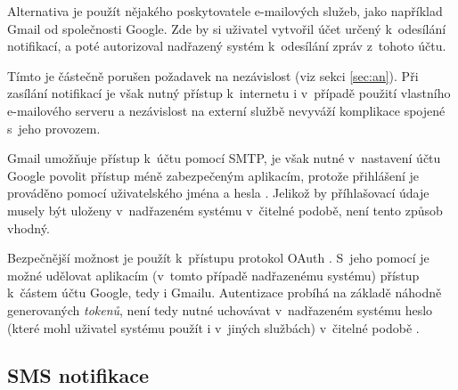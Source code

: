 Alternativa je použít nějakého poskytovatele e-mailových služeb, jako například Gmail od společnosti Google. Zde by si uživatel vytvořil účet určený k~odesílání notifikací, a poté autorizoval nadřazený systém k~odesílání zpráv z~tohoto účtu. 

Tímto je částečně porušen požadavek na nezávislost (viz sekci \ref{sec:an}). Při zasílání notifikací je však nutný přístup k~internetu i v~případě použití vlastního e-mailového serveru a nezávislost na externí službě nevyváží komplikace spojené s~jeho provozem.

Gmail umožňuje přístup k~účtu pomocí SMTP, je však nutné v~nastavení účtu Google povolit přístup méně zabezpečeným aplikacím, protože přihlášení je prováděno pomocí uživatelského jména a hesla \cite{google_smtp}. Jelikož by příhlašovací údaje musely být uloženy v~nadřazeném systému v~čitelné podobě, není tento způsob vhodný.

Bezpečnější možnost je použít k~přístupu protokol OAuth \cite{rfc6749}. S~jeho pomocí je možné udělovat aplikacím (v~tomto případě nadřazenému systému) přístup k~částem účtu Google, tedy i Gmailu. Autentizace probíhá na základě náhodně generovaných \textit{tokenů}, není tedy nutné uchovávat v~nadřazeném systému heslo (které mohl uživatel systému použít i v~jiných službách) v~čitelné podobě \cite{google_oauth}.


\subsection{SMS notifikace}




